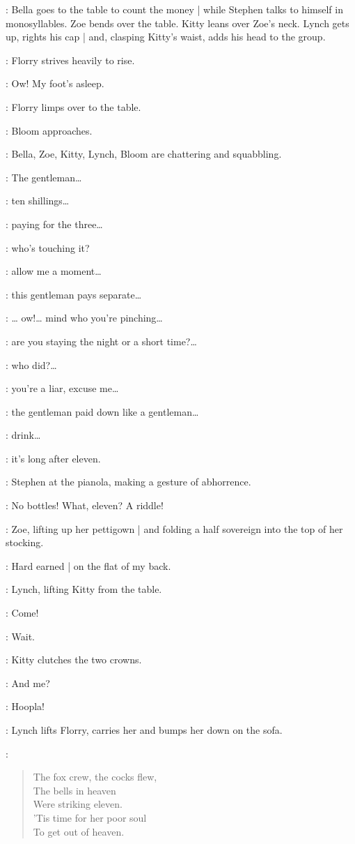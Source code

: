 :
Bella goes to the table to count the money |
while Stephen talks to himself in monosyllables.
Zoe bends over the table.
Kitty leans over Zoe's neck.
%
Lynch gets up,
rights his cap |
and,
clasping Kitty's waist,
adds his head to the group.

:
Florry strives heavily to rise.

\Florry:
Ow!
My foot's asleep.

:
Florry limps over to the table.

:
Bloom approaches.

:
Bella,
Zoe,
Kitty,
Lynch,
Bloom are chattering and squabbling.

\Zoe:
The gentleman…

\Bella:
ten shillings…

\Lynch:
paying for the three…

\Kitty:
who's touching it?

\Bloom:
allow me a moment…

\Zoe:
this gentleman pays separate…

\Kitty:
… ow!…
mind who you're pinching…

\Bella:
are you staying the night or a short time?…

\Lynch:
who did?…

\Kitty:
you're a liar,
excuse me…

\Zoe:
the gentleman paid down like a gentleman…

\Lynch:
drink…

\Bella:
it's long after eleven.

:
Stephen at the pianola,
making a gesture of abhorrence.

\Stephen:
No bottles!
What,
eleven?
A riddle!

:
Zoe,
lifting up her pettigown |
and folding a half sovereign into the top of her stocking.

\Zoe:
Hard earned |
on the flat of my back.

:
Lynch,
lifting Kitty from the table.

\Lynch:
Come!

\Kitty:
Wait.

:
Kitty clutches the two crowns.

\Florry:
And me?

\Lynch:
Hoopla!

:
Lynch lifts Florry,
carries her and bumps her down on the sofa.

\Stephen:
\begin{verse}
    The fox crew, the cocks flew,\\
    The bells in heaven\\
    Were striking eleven.\\
%
    'Tis time for her poor soul\\
    To get out of heaven.
\end{verse}

